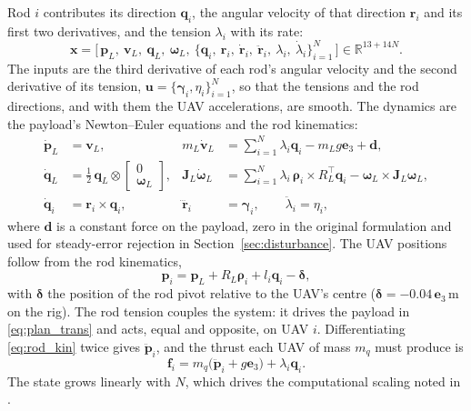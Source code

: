 Rod $i$ contributes its direction $\mathbf{q}_i$, the angular velocity of that direction $\mathbf{r}_i$
and its first two derivatives, and the tension $\lambda_i$ with its rate:
\begin{equation}
    \mathbf{x} = \big[\, \mathbf{p}_L,\ \mathbf{v}_L,\ \mathbf{q}_L,\ \boldsymbol{\omega}_L,\
    \{\mathbf{q}_i,\ \mathbf{r}_i,\ \dot{\mathbf{r}}_i,\ \ddot{\mathbf{r}}_i,\ \lambda_i,\ \dot{\lambda}_i\}_{i=1}^{N} \,\big]
    \in \mathbb{R}^{13+14N}.
\end{equation}
The inputs are the third derivative of each rod's angular velocity and the second derivative of its
tension, $\mathbf{u} = \{\boldsymbol{\gamma}_i, \eta_i\}_{i=1}^N$, so that the tensions and the rod
directions, and with them the UAV accelerations, are smooth. The dynamics are the payload's
Newton--Euler equations and the rod kinematics:
\begin{align}
    \dot{\mathbf{p}}_L &= \mathbf{v}_L, &
    m_L \dot{\mathbf{v}}_L &= \sum_{i=1}^{N} \lambda_i \mathbf{q}_i - m_L g \mathbf{e}_3 + \mathbf{d},
    \label{eq:plan_trans} \\
    \dot{\mathbf{q}}_L &= \tfrac{1}{2}\, \mathbf{q}_L \otimes \begin{bmatrix} 0 \\ \boldsymbol{\omega}_L \end{bmatrix}, &
    \mathbf{J}_L \dot{\boldsymbol{\omega}}_L &= \sum_{i=1}^{N} \lambda_i\, \boldsymbol{\rho}_i \times R_L^\top \mathbf{q}_i
    - \boldsymbol{\omega}_L \times \mathbf{J}_L \boldsymbol{\omega}_L, \\
    \dot{\mathbf{q}}_i &= \mathbf{r}_i \times \mathbf{q}_i, &
    \dddot{\mathbf{r}}_i &= \boldsymbol{\gamma}_i, \qquad \ddot{\lambda}_i = \eta_i,
\end{align}
where $\mathbf{d}$ is a constant force on the payload, zero in the original formulation and used for
steady-error rejection in Section~\ref{sec:disturbance}. The UAV positions follow from the rod
kinematics,
\begin{equation}
    \mathbf{p}_i = \mathbf{p}_L + R_L \boldsymbol{\rho}_i + l_i \mathbf{q}_i - \boldsymbol{\delta},
    \label{eq:rod_kin}
\end{equation}
with $\boldsymbol{\delta}$ the position of the rod pivot relative to the UAV's
centre ($\boldsymbol{\delta} = -0.04\,\mathbf{e}_3$\,m on the rig). The rod tension couples the system:
it drives the payload in \eqref{eq:plan_trans} and acts, equal and opposite, on UAV $i$.
Differentiating \eqref{eq:rod_kin} twice gives $\ddot{\mathbf{p}}_i$, and the thrust each UAV of mass
$m_q$ must produce is
\begin{equation}
    \mathbf{f}_i = m_q\big(\ddot{\mathbf{p}}_i + g\mathbf{e}_3\big) + \lambda_i \mathbf{q}_i .
    \label{eq:thrust_req}
\end{equation}
The state grows linearly with $N$, which drives the computational scaling noted in \cite{tudelft}.
